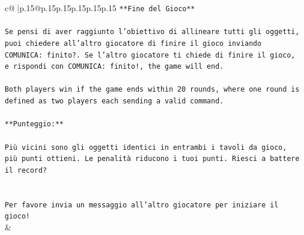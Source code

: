 \documentclass{article}
\begin{document}
{\begin{supertabular}{c@{$\;$}|p{.15\linewidth}@{}p{.15\linewidth}p{.15\linewidth}p{.15\linewidth}p{.15\linewidth}p{.15\linewidth}}
{{{\texttt{**Fine del Gioco**} \\
\\ 
\texttt{Se pensi di aver raggiunto l'obiettivo di allineare tutti gli oggetti, puoi chiedere all'altro giocatore di finire il gioco inviando COMUNICA: finito?. Se l'altro giocatore ti chiede di finire il gioco, e rispondi con COMUNICA: finito!, the game will end.} \\
\\ 
\texttt{Both players win if the game ends within 20 rounds, where one round is defined as two players each sending a valid command.} \\
\\ 
\texttt{**Punteggio:**} \\
\\ 
\texttt{Più vicini sono gli oggetti identici in entrambi i tavoli da gioco, più punti ottieni. Le penalità riducono i tuoi punti. Riesci a battere il record?} \\
\\ 
\\ 
\texttt{Per favore invia un messaggio all'altro giocatore per iniziare il gioco!} \\
            }
        }
    }
    & \\ \\


\end{supertabular}}
\end{document}
